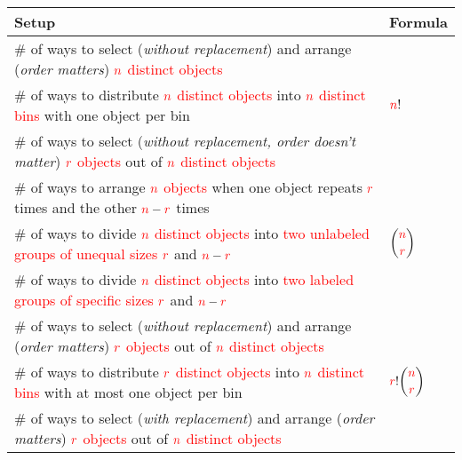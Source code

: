 \documentclass[12pt,addpoints,answers]{exam}
\begin{document}
\pagestyle{headandfoot}
\begin{center}
\mylogo
\end{center}
\begin{questions}
\question 
\begin{center}
\renewcommand{\arraystretch}{1.8}
\begin{tabular}{|p{}|M{0.2\textwidth}|}
\hline
\centering \textbf{Setup}& \textbf{Formula}\\
\hline
\# of ways to select (\emph{without replacement}) and arrange (\emph{order matters}) ${{\mathcolor{red}n}}$ \textcolor{red}{distinct objects}& \\
\# of ways to distribute ${{\mathcolor{red}n}}$ \textcolor{red}{distinct objects} into ${{\mathcolor{red}n}}$ \textcolor{red}{distinct bins} with one object per bin& \\
\hline
\# of ways to select (\emph{without replacement, order doesn't matter}) ${{\mathcolor{red}r}}$ \textcolor{red}{objects} out of ${{\mathcolor{red}n}}$ \textcolor{red}{distinct objects}&  \\
\# of ways to arrange ${{\mathcolor{red}n}}$ \textcolor{red}{objects} when one object repeats ${{\mathcolor{red}r}}$ times and the other ${{\mathcolor{red}n}}-{{\mathcolor{red}r}}$ times & \\
\# of ways to divide ${{\mathcolor{red}n}}$ \textcolor{red}{distinct objects} into \textcolor{red}{two unlabeled groups of unequal sizes} ${{\mathcolor{red}r}}$ and ${{\mathcolor{red}n}}-{{\mathcolor{red}r}}$&  \\
\# of ways to divide ${{\mathcolor{red}n}}$ \textcolor{red}{distinct objects} into \textcolor{red}{two labeled groups of specific sizes} ${{\mathcolor{red}r}}$ and ${{\mathcolor{red}n}}-{{\mathcolor{red}r}}$&
\\
\hline
\# of ways to select (\emph{without replacement}) and arrange (\emph{order matters}) ${{\mathcolor{red}r}}$ \textcolor{red}{objects} out of ${{\mathcolor{red}n}}$ \textcolor{red}{distinct objects}&\\
\# of ways to distribute ${{\mathcolor{red}r}}$ \textcolor{red}{distinct objects} into ${{\mathcolor{red}n}}$ \textcolor{red}{distinct bins} with at most one object per bin& \\
\hline
 \# of ways to select (\emph{with replacement}) and arrange (\emph{order matters}) ${{\mathcolor{red}r}}$ \textcolor{red}{objects} out of ${{\mathcolor{red}n}}$ \textcolor{red}{distinct objects}&\\

\end{tabular}
\end{center}
\end{questions}
\end{document}

